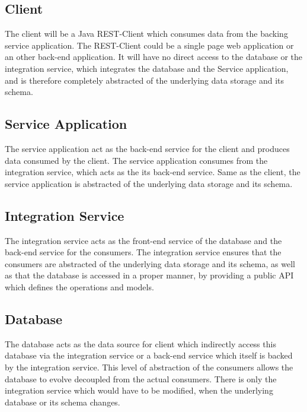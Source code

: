 \subsection{Client}
\label{sec:esboc-design-service-client}
The client will be a Java REST-Client which consumes data from the backing service application. The REST-Client could be a single page web application or an other back-end application. It will have no direct access to the database or the integration service, which integrates the database and the Service application, and is therefore completely abstracted of the underlying data storage and its schema.

\subsection{Service Application}
\label{sec:esboc-design-service-app}
The service application act as the back-end service for the client and produces data consumed by the client. The service application consumes from the integration service, which acts as the its back-end service. Same as the client, the service application is abstracted of the underlying data storage and its schema. 

\subsection{Integration Service}
\label{sec:esboc-design-service-integration}
The integration service acts as the front-end service of the database and the back-end service for the consumers. The integration service ensures that the consumers are abstracted of the underlying data storage and its schema, as well as that the database is accessed in a proper manner, by providing a public API which defines the operations and models.

\subsection{Database}
\label{sec:esboc-design-service-database}
The database acts as the data source for client which indirectly access this database via the integration service or a back-end service which itself is backed by the integration service. This level of abstraction of the consumers allows the database to evolve decoupled from the actual consumers. There is only the integration service which would have to be modified, when the underlying database or its schema changes.

